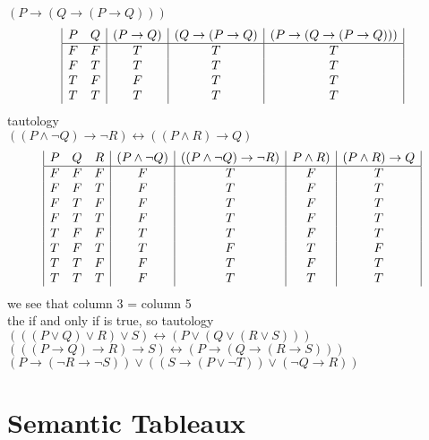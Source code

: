 \documentclass[a4paper,12pt]{article}
\begin{document}
$(P \rightarrow (Q \rightarrow (P \rightarrow Q)))$\\
\begin{displaymath}
\begin {array} {|c c |c|c|c|}
P & Q & (P \rightarrow Q) & (Q \rightarrow (P \rightarrow Q) 
&(P \rightarrow (Q \rightarrow (P \rightarrow Q)))\\
\hline
F & F & T & T & T \\
F & T & T & T & T \\
T & F & F & T & T \\
T & T & T & T & T \\

\end{array}
\end{displaymath}
tautology\\

$((P \wedge \lnot Q) \rightarrow \lnot R) \leftrightarrow ((P \wedge R) \rightarrow Q)$\\
\begin{displaymath}
\begin {array} {|c c c|c|c|c|c|c|c|}
P & Q & R & (P \wedge \lnot Q) & 
((P \wedge \lnot Q) \rightarrow \lnot R)&
P \wedge R) &
(P \wedge R) \rightarrow Q\\
\hline
F & F & F & F & T & F & T\\
F & F & T & F & T & F & T\\
F & T & F & F & T & F & T\\
F & T & T & F & T & F & T\\
T & F & F & T & T & F & T\\
T & F & T & T & F & T & F\\
T & T & F & F & T & F & T\\
T & T & T & F & T & T & T\\
\end{array}
\end{displaymath}
we see that column 3 = column 5\\
the if and only if is true, so tautology\\

$(((P \vee Q) \vee R) \vee S) \leftrightarrow (P \vee (Q \vee (R \vee S)))$\\
$(((P \rightarrow Q) \rightarrow R) \rightarrow S) \leftrightarrow (P \rightarrow (Q \rightarrow (R \rightarrow S)))$\\
$(P \rightarrow (\lnot R \rightarrow \lnot S)) \vee ((S \rightarrow (P \vee \lnot T)) \vee (\lnot Q \rightarrow R))$\\
\section{Semantic Tableaux}
\end{document}
